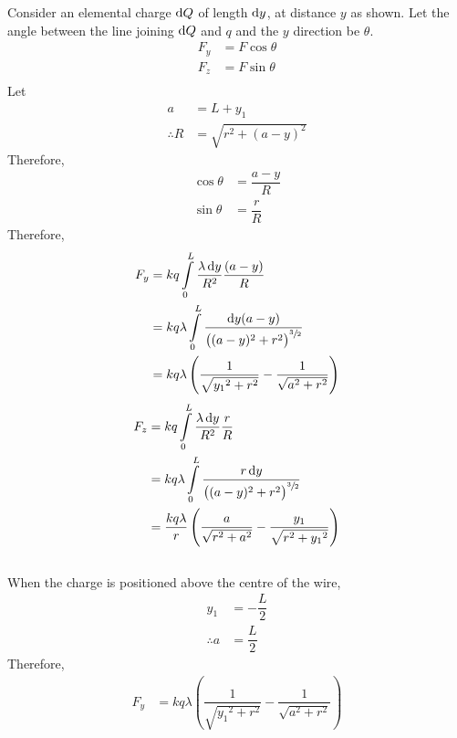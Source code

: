 \documentclass[fleqn, a4paper, 12pt, twoside]{article}
\theoremstyle{definition}
\theoremstyle{theorem}
\begin{document}
\begin{solution}[print]
\begin{figure}[H]
	\end{figure}
	Consider an elemental charge $\dif Q$ of length $\dif y$, at distance $y$ as shown. Let the angle between the line joining $\dif Q$ and $q$ and the $y$ direction be $\theta$.
	\begin{align*}
		F_y &= F \cos \theta\\
		F_z &= F \sin \theta\\
	\end{align*}
	Let
	\begin{align*}
		a &= L + y_1\\
		\therefore R &= \sqrt{r^2 + (a - y)^2}
	\end{align*}
	Therefore,
	\begin{align*}
		\cos \theta &= \dfrac{a - y}{R}\\
		\sin \theta &= \dfrac{r}{R}
	\end{align*}
	Therefore,
	\begin{align*}
		F_y &= k q \int\limits_{0}^{L} \dfrac{\lambda \dif y}{R^2} \dfrac{(a - y)}{R}\\
		&= k q \lambda \int\limits_{0}^{L} \dfrac{\dif y (a - y)}{\left( (a - y)^2 + r^2 \right)^{\sfrac{3}{2}}}\\
		&= k q \lambda \left( \dfrac{1}{\sqrt{{y_1}^2 + r^2}} - \dfrac{1}{\sqrt{a^2 + r^2}} \right)
	\end{align*}
	\begin{align*}
		F_z &= k q \int\limits_{0}^{L} \dfrac{\lambda \dif y}{R^2} \dfrac{r}{R}\\
		&= k q \lambda \int\limits_{0}^{L} \dfrac{r \dif y}{\left( (a - y)^2 + r^2 \right)^{\sfrac{3}{2}}}\\
		&= \dfrac{k q \lambda}{r} \left( \dfrac{a}{\sqrt{r^2 + a^2}} - \dfrac{y_1}{\sqrt{r^2 + {y_1}^2}} \right)
	\end{align*}
	~\\
	When the charge is positioned above the centre of the wire,
	\begin{align*}
		y_1 &= -\dfrac{L}{2}\\
		\therefore a &= \dfrac{L}{2}
	\end{align*}
	Therefore,
	\begin{align*}
		F_y &= k q \lambda \left( \dfrac{1}{\sqrt{{y_1}^2 + r^2}} - \dfrac{1}{\sqrt{a^2 + r^2}} \right)\\

\end{align*}
\end{solution}
\end{document}
